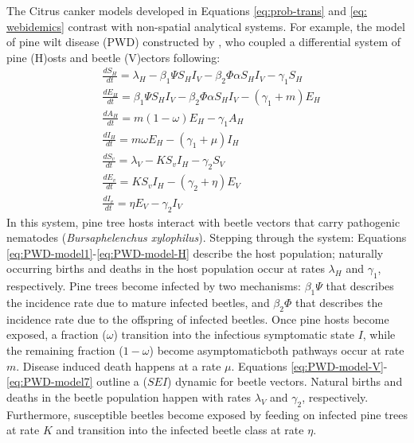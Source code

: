 The Citrus canker models developed in Equations \ref{eq:prob-trans} and \ref{eq: webidemics} 
contrast with non-spatial analytical systems. For example, the model of pine wilt disease (PWD)
constructed by \cite{khan2020modelling}, who coupled a differential system of pine (H)osts and beetle (V)ectors 
following:
\begin{align}
    \label{eq:PWD-model1}
    &\frac{dS_H}{dt} = \lambda_H - \beta_1\Psi S_H I_V - \beta_2\Phi\alpha S_H I_V - \gamma_1 S_H \\
    &\frac{dE_H}{dt} = \beta_1\Psi S_H I_V - \beta_2\Phi\alpha S_H I_V  - (\gamma_1 + m)E_H \\
    &\frac{dA_H}{dt} = m(1 - \omega)E_H - \gamma_1 A_H \\
    \label{eq:PWD-model-H}
    &\frac{dI_H}{dt} = m \omega E_H - (\gamma_1 + \mu ) I_H \\
    \label{eq:PWD-model-V}
    &\frac{dS_v}{dt} = \lambda_V - K S_v I_H - \gamma_2 S_V \\
    &\frac{dE_v}{dt} = K S_v I_H - (\gamma_2 + \eta) E_V \\
    \label{eq:PWD-model7}
    &\frac{dI_v}{dt} = \eta E_V - \gamma_2 I_V
\end{align}
In this system, pine tree hosts interact with beetle vectors that carry pathogenic nematodes 
(\textit{Bursaphelenchus xylophilus}). Stepping through the system:
Equations \ref{eq:PWD-model1}-\ref{eq:PWD-model-H} describe the host population;
naturally occurring births and deaths in the host population occur at rates $\lambda_H$ and $\gamma_1$, 
respectively. Pine trees become infected by two mechanisms: $\beta_1\Psi$ that describes the incidence
rate due to mature infected beetles, and $\beta_2\Phi$ that describes the incidence rate due to the offspring
of infected beetles.
Once pine hosts become exposed, a fraction ($\omega$) transition into the infectious symptomatic state $I$, 
while the remaining fraction ($1 -\omega$) become asymptomatic\textemdash both pathways occur at rate $m$. 
Disease induced death happens at a rate $\mu$. Equations \ref{eq:PWD-model-V}-\ref{eq:PWD-model7} outline a 
($SEI$) dynamic for beetle vectors. Natural births and deaths in the beetle population happen with rates 
$\lambda_V$ and $\gamma_2$, respectively. Furthermore, susceptible beetles become exposed by feeding on
infected pine trees at rate $K$ and transition into the infected beetle class at rate $\eta$.

